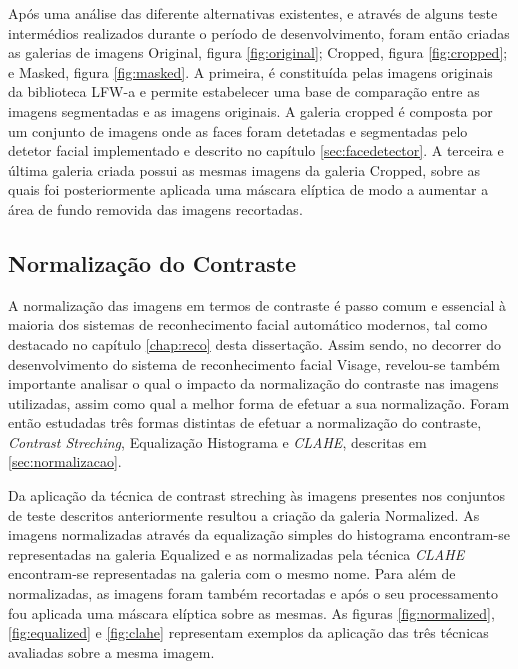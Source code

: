Após uma análise das diferente alternativas existentes, e através de alguns teste intermédios realizados durante o período de desenvolvimento, foram então criadas as galerias de imagens Original, figura \ref{fig:original}; Cropped, figura \ref{fig:cropped}; e Masked, figura \ref{fig:masked}. A primeira, é constituída pelas imagens originais da biblioteca LFW-a e permite estabelecer uma base de comparação entre as imagens segmentadas e as imagens originais. A galeria cropped é composta por um conjunto de imagens onde as faces foram detetadas e segmentadas pelo detetor facial implementado e descrito no capítulo \ref{sec:facedetector}. A terceira e última galeria criada possui as mesmas imagens da galeria Cropped, sobre as quais foi posteriormente aplicada uma máscara elíptica de modo a aumentar a área de fundo removida das imagens recortadas.

\subsection{Normalização do Contraste} \label{sec:pre-normalizacao}
A normalização das imagens em termos de contraste é passo comum e essencial à maioria dos sistemas de reconhecimento facial automático modernos, tal como destacado no capítulo \ref{chap:reco} desta dissertação. Assim sendo, no decorrer do desenvolvimento do sistema de reconhecimento facial Visage, revelou-se também importante analisar o qual o impacto da normalização do contraste nas imagens utilizadas, assim como qual a melhor forma de efetuar a sua normalização. Foram então estudadas três formas distintas de efetuar a normalização do contraste, \textit{Contrast Streching}, Equalização Histograma e \textit{CLAHE}, descritas em \ref{sec:normalizacao}.

Da aplicação da técnica de contrast streching às imagens presentes nos conjuntos de teste descritos anteriormente resultou a criação da galeria Normalized. As imagens normalizadas através da equalização simples do histograma encontram-se representadas na galeria Equalized e as normalizadas pela técnica \textit{CLAHE} encontram-se representadas na galeria com o mesmo nome. Para além de normalizadas, as imagens foram também recortadas e após o seu processamento fou aplicada uma máscara elíptica sobre as mesmas. As figuras \ref{fig:normalized}, \ref{fig:equalized} e \ref{fig:clahe} representam exemplos da aplicação das três técnicas avaliadas sobre a mesma imagem.

